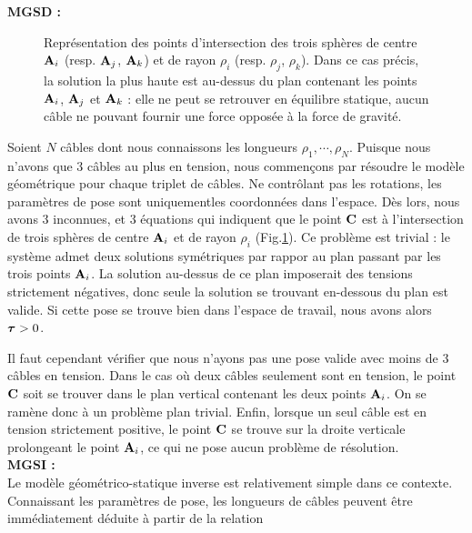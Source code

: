 {\bf MGSD :}\\

\begin{figure}[!ht]
  \centering
    \def\svgwidth{.95\linewidth}
      
    \caption{\footnotesize{Repr\'esentation des points d'intersection des 
trois sph\`eres de centre ${\bf A}_i$ (resp. ${\bf A}_j$, ${\bf A}_k$) et de 
rayon $\rho_i$ (resp. $\rho_j$, $\rho_k$). Dans ce cas pr\'ecis, la solution la 
plus haute est au-dessus du plan contenant les points ${\bf A}_i$, ${\bf 
A}_j$ et ${\bf A}_k$ : elle ne peut se retrouver en \'equilibre statique, 
aucun c\^able ne pouvant fournir une force oppos\'ee \`a la force de 
gravit\'e.}}
\label{intro:fig6b}
\end{figure}

Soient $N$ c\^ables dont nous connaissons les longueurs $\rho_1, \cdots, 
\rho_{N}$. Puisque nous n'avons que $3$ c\^ables au plus en tension, nous 
commen\c cons par r\'esoudre le mod\`ele g\'eom\'etrique pour chaque 
triplet de c\^ables. Ne contr\^olant pas les rotations, les param\`etres de 
pose sont uniquementles coordonn\'ees dans l'espace. D\`es lors, nous avons $3$ 
inconnues, et $3$ \'equations qui indiquent que le point $\bf C$ est 
à l'intersection de trois sph\`eres de centre ${\bf A}_i$ et de rayon $\rho_i$ 
(Fig.\ref{intro:fig6b}). Ce problème est trivial : le système admet deux 
solutions symétriques par rappor au plan passant par les trois points ${\bf 
A}_i$. La solution au-dessus de ce plan imposerait des tensions strictement 
négatives, donc seule la solution se trouvant en-dessous du plan est valide. Si 
cette pose se trouve bien dans l'espace de travail, nous avons alors $\hbox{\boldmath $\tau$} > 
0$.

Il faut cependant v\'erifier que nous n'ayons pas une pose valide avec moins de 
$3$ c\^ables en tension. Dans le cas où deux câbles seulement sont en tension, 
le point $\bf C$ soit se trouver dans le plan vertical contenant les deux 
points ${\bf A}_i$. On se ramène donc à un problème plan trivial. Enfin, lorsque 
un seul câble est en tension strictement positive, le point ${\bf C}$ se trouve 
sur la droite verticale prolongeant le point ${\bf A}_i$, ce qui ne pose aucun 
problème de résolution.\\

{\bf MGSI :}\\

Le mod\`ele g\'eom\'etrico-statique inverse est relativement simple dans ce 
contexte. Connaissant les param\`etres de pose, les longueurs de c\^ables 
peuvent \^etre imm\'ediatement d\'eduite \`a partir de la relation 

